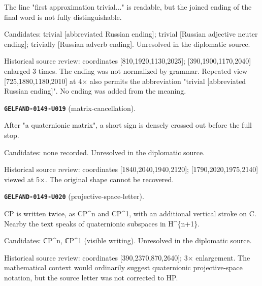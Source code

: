\documentclass[11pt]{article}
\theoremstyle{definition}
\theoremstyle{remark}
\begin{document}
The line "first approximation trivial..." is readable, but the joined ending of the final word is not fully distinguishable.\par
Candidates: trivial [abbreviated Russian ending]; trivial [Russian adjective neuter ending]; trivially [Russian adverb ending]. Unresolved in the diplomatic source.\par
Historical source review: coordinates [810,1920,1130,2025]; [390,1900,1170,2040] enlarged 3 times. The ending was not normalized by grammar. Repeated view [725,1880,1180,2010] at 4× also permits the abbreviation "trivial [abbreviated Russian ending]". No ending was added from the meaning.\par\medskip
\noindent\leavevmode{}\label{GELFAND-P001371:matrix-cancellation:note}\textbf{\texttt{GELFAND-0149-U019}} (matrix-cancellation).\par\nopagebreak[4]
After "a quaternionic matrix", a short sign is densely crossed out before the full stop.\par
Candidates: none recorded. Unresolved in the diplomatic source.\par
Historical source review: coordinates [1840,2040,1940,2120]; [1790,2020,1975,2140] viewed at 5×. The original shape cannot be recovered.\par\medskip
\noindent\leavevmode{}\label{GELFAND-P001371:projective-space-letter:note}\textbf{\texttt{GELFAND-0149-U020}} (projective-space-letter).\par\nopagebreak[4]
CP is written twice, as CP\textasciicircum{}n and CP\textasciicircum{}1, with an additional vertical stroke on C. Nearby the text speaks of quaternionic subspaces in H\textasciicircum{}\{n+1\}.\par
Candidates: ℂP\textasciicircum{}n, ℂP\textasciicircum{}1 (visible writing). Unresolved in the diplomatic source.\par
Historical source review: coordinates [390,2370,870,2640]; 3× enlargement. The mathematical context would ordinarily suggest quaternionic projective-space notation, but the source letter was not corrected to HP.\par\medskip
\end{document}
